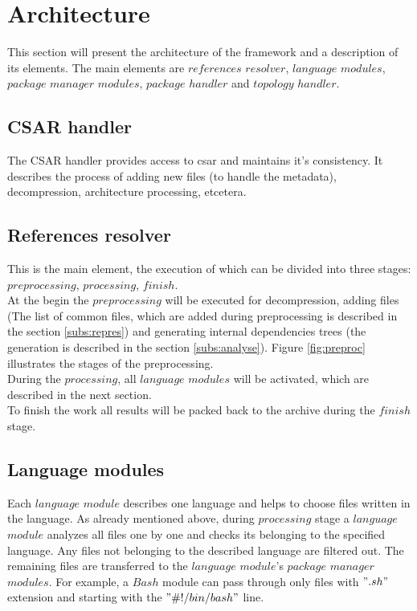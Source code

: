\section{Architecture}\label{sec:arch}
This section will present the architecture of the framework and a description of its elements.
The main elements are $references$ $resolver$, $language$ $modules$, $package$ $manager$ $modules$, $package$ $handler$ and $topology$ $handler$.

\subsection{CSAR handler} \label{subs:casr_h}
The CSAR handler provides access to \gls{csar} and maintains it's consistency. 
It describes the process of adding new files (to handle the metadata), decompression, architecture processing, etcetera.

\subsection{References resolver} \label{subs:RR}
This is the main element, the execution of which can be divided into three stages: $preprocessing$, $processing$, $finish$. \\
At the begin the $preprocessing$ will be executed for decompression, adding files (The list of common files, which are added during preprocessing is described in the section \ref{subs:repres}) and generating internal dependencies trees (the generation is described in the section \ref{subs:analyse}).
Figure \ref{fig:preproc} illustrates the stages of the preprocessing.\\

During the $processing$, all $language$ $modules$ will be activated, which are described in the next section. \\
To finish the work  all results will be packed back to the archive during the $finish$ stage.
\subsection{Language modules} \label{subs:archlm}
Each $language$ $module$ describes one language and helps to choose files written in the language.
As already mentioned above, during $processing$ stage a $language$ $module$ analyzes all files one by one and checks its belonging to the specified language. 
Any files not belonging to the described language are filtered out.
The remaining files are transferred to the $language$ $module$'s $package$ $manager$ $modules$.
For example, a $Bash$ module can pass through only files with $".sh"$ extension and starting with the $"\#!/bin/bash"$ line.
